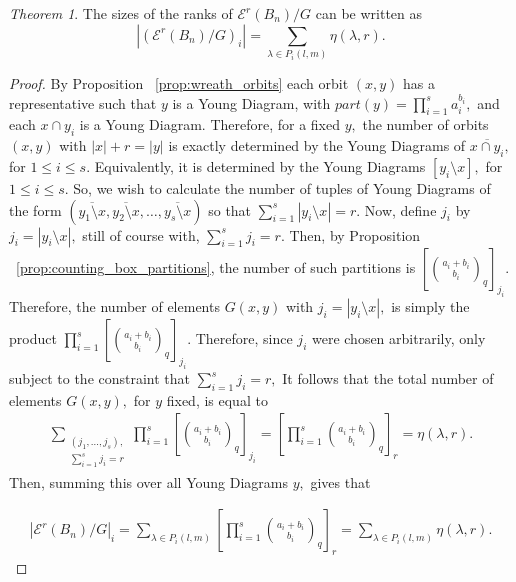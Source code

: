 \documentclass[10 pt]{amsart}
\theoremstyle{plain}
\theoremstyle{definition}
\theoremstyle{remark}
\numberwithin{equation}{section}
\newtheorem{thm}{Theorem}[section]
\theoremstyle{remark}
\begin{document}
\begin{thm}
\label{thm:quotiented_edge_wreath}
The sizes of the ranks of $\mathcal E^r(B_n)/G$ can be written as 
$$|(\mathcal E^r(B_n)/G)_i| = \sum_{\lambda \in P_i(l,m)} \eta(\lambda,r).$$
\end{thm}
\begin{proof}

By Proposition ~\ref{prop:wreath_orbits} each orbit $(x, y)$ has a representative such that $y$ is a Young Diagram, with $part(y) = \prod_{i=1}^s a_i^{b_i},$ and each $x \cap y_i$ is a Young Diagram. Therefore, for a fixed $y,$ the number of orbits $(x, y)$ with $|x|+r = |y|$ is exactly determined by the Young Diagrams of $\overline{x \cap y_i},$ for $1 \leq i \leq s.$ Equivalently, it is determined by the Young Diagrams $[y_i \setminus x],$ for $1 \leq i \leq s.$ So, we wish to calculate the number of tuples of Young Diagrams of the form $(\overline{y_1 \setminus x},\overline{y_2 \setminus x},\ldots, \overline{y_s \setminus x})$ so that $\sum_{i=1}^s |y_i \setminus x| = r.$ Now, define $j_i$ by $j_i = |y_i \setminus x|,$ still of course with, $\sum_{i=1}^s j_i = r.$ Then, by Proposition ~\ref{prop:counting_box_partitions}, the number of such partitions is $[\binom {a_i+b_i} {b_i}_q]_{j_i}.$ Therefore, the number of elements $G(x, y)$ with $j_i = |y_i \setminus x|,$ is simply the product $\prod_{i=1}^s [\binom {a_i+b_i} {b_i}_q]_{j_i}.$ Therefore, since $j_i$ were chosen arbitrarily, only subject to the constraint that $\sum_{i=1}^s j_i = r,$ It follows that the total number of elements $G(x, y),$ for $y$ fixed, is equal to 
\begin{align*}
\sum_{\substack{{(j_1,\ldots, j_s),}\\{\sum_{i=1}^s j_i = r}}} \prod_{i=1}^s \left[\binom {a_i+b_i} {b_i}_q\right]_{j_i} = \left[\prod_{i=1}^s \binom {a_i+b_i} {b_i}_q\right]_{r} = \eta(\lambda,r).
\end{align*}
Then, summing this over all Young Diagrams $y,$ gives that

\begin{align*}
|\mathcal E^r(B_n)/G|_i = \sum_{\lambda \in P_i(l,m)}  \left[\prod_{i=1}^s \binom {a_i+b_i} {b_i}_q\right]_{r} = \sum_{\lambda \in P_i(l,m)} \eta(\lambda,r).
\end{align*}

\end{proof}



\end{document}
